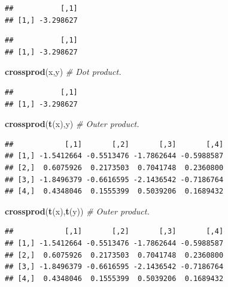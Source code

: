 \documentclass[]{book}
\newenvironment{Shaded}{\begin{snugshade}}{\end{snugshade}}
\newcommand{\CommentTok}[1]{\textcolor[rgb]{0.56,0.35,0.01}{\textit{#1}}}
\newcommand{\KeywordTok}[1]{\textcolor[rgb]{0.13,0.29,0.53}{\textbf{#1}}}
\newcommand{\NormalTok}[1]{#1}
\newcommand{\OperatorTok}[1]{\textcolor[rgb]{0.81,0.36,0.00}{\textbf{#1}}}
\newcommand{\StringTok}[1]{\textcolor[rgb]{0.31,0.60,0.02}{#1}}
\theoremstyle{definition}
\theoremstyle{definition}
\theoremstyle{definition}
\theoremstyle{remark}
\begin{document}
\begin{verbatim}
##           [,1]
## [1,] -3.298627
\end{verbatim}

\begin{Shaded}
\end{Shaded}

\begin{verbatim}
##           [,1]
## [1,] -3.298627
\end{verbatim}

\begin{Shaded}
\begin{Highlighting}[]
\KeywordTok{crossprod}\NormalTok{(x,y) }\CommentTok{# Dot product.}
\end{Highlighting}
\end{Shaded}

\begin{verbatim}
##           [,1]
## [1,] -3.298627
\end{verbatim}

\begin{Shaded}
\begin{Highlighting}[]
\KeywordTok{crossprod}\NormalTok{(}\KeywordTok{t}\NormalTok{(x),y) }\CommentTok{# Outer product.}
\end{Highlighting}
\end{Shaded}

\begin{verbatim}
##            [,1]       [,2]       [,3]       [,4]
## [1,] -1.5412664 -0.5513476 -1.7862644 -0.5988587
## [2,]  0.6075926  0.2173503  0.7041748  0.2360800
## [3,] -1.8496379 -0.6616595 -2.1436542 -0.7186764
## [4,]  0.4348046  0.1555399  0.5039206  0.1689432
\end{verbatim}

\begin{Shaded}
\begin{Highlighting}[]
\KeywordTok{crossprod}\NormalTok{(}\KeywordTok{t}\NormalTok{(x),}\KeywordTok{t}\NormalTok{(y)) }\CommentTok{# Outer product.}
\end{Highlighting}
\end{Shaded}

\begin{verbatim}
##            [,1]       [,2]       [,3]       [,4]
## [1,] -1.5412664 -0.5513476 -1.7862644 -0.5988587
## [2,]  0.6075926  0.2173503  0.7041748  0.2360800
## [3,] -1.8496379 -0.6616595 -2.1436542 -0.7186764
## [4,]  0.4348046  0.1555399  0.5039206  0.1689432
\end{verbatim}
\end{document}
